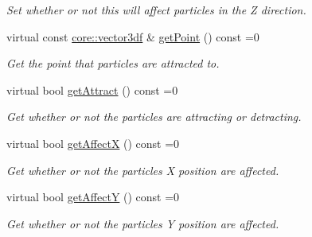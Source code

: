 \begin{DoxyCompactItemize}
\begin{DoxyCompactList}\small\item\em Set whether or not this will affect particles in the Z direction. \end{DoxyCompactList}\item 
\mbox{\label{classirr_1_1scene_1_1IParticleAttractionAffector_a170e9d369460225b11ed3f8cfe1e426b}} 
virtual const \hyperlink{namespaceirr_1_1core_ae6e2b2a6c552833ebbd5b7463d03586b}{core\+::vector3df} \& \hyperlink{classirr_1_1scene_1_1IParticleAttractionAffector_a170e9d369460225b11ed3f8cfe1e426b}{get\+Point} () const =0
\begin{DoxyCompactList}\small\item\em Get the point that particles are attracted to. \end{DoxyCompactList}\item 
\mbox{\label{classirr_1_1scene_1_1IParticleAttractionAffector_a860d078586d99905c261804a857d9ff8}} 
virtual bool \hyperlink{classirr_1_1scene_1_1IParticleAttractionAffector_a860d078586d99905c261804a857d9ff8}{get\+Attract} () const =0
\begin{DoxyCompactList}\small\item\em Get whether or not the particles are attracting or detracting. \end{DoxyCompactList}\item 
\mbox{\label{classirr_1_1scene_1_1IParticleAttractionAffector_a8ccecdafff68056bbb4348256875e7cb}} 
virtual bool \hyperlink{classirr_1_1scene_1_1IParticleAttractionAffector_a8ccecdafff68056bbb4348256875e7cb}{get\+AffectX} () const =0
\begin{DoxyCompactList}\small\item\em Get whether or not the particles X position are affected. \end{DoxyCompactList}\item 
\mbox{\label{classirr_1_1scene_1_1IParticleAttractionAffector_a06a2872adddd7bfca9f79325563dd799}} 
virtual bool \hyperlink{classirr_1_1scene_1_1IParticleAttractionAffector_a06a2872adddd7bfca9f79325563dd799}{get\+AffectY} () const =0
\begin{DoxyCompactList}\small\item\em Get whether or not the particles Y position are affected. \end{DoxyCompactList}\item 

\end{DoxyCompactItemize}
